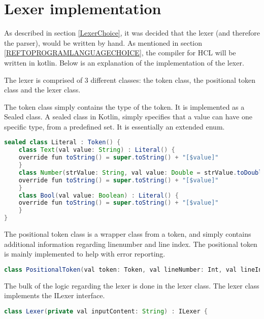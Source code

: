 \section{Lexer implementation}
As described in section \ref{LexerChoice}, it was decided that the lexer (and therefore the parser), would be written by hand.
As mentioned in section \ref{REFTOPROGRAMLANGUAGECHOICE}, the compiler for HCL will be written in kotlin.
Below is an explanation of the implementation of the lexer.

The lexer is comprised of 3 different classes: the token class, the positional token class and the lexer class.

The token class simply contains the type of the token. 
It is implemented as a Sealed class. 
A sealed class in Kotlin, simply specifies that a value can have one specific type, from a predefined set\cite{KotlinSealed}.
It is essentially an extended enum.
\begin{lstlisting}[language=java,label=lis:tokenClass,caption=A snippet from the token class .,firstnumber=9]
sealed class Literal : Token() {
	class Text(val value: String) : Literal() {
	override fun toString() = super.toString() + "[$value]"
	}
	class Number(strValue: String, val value: Double = strValue.toDouble()) : Literal() {
	override fun toString() = super.toString() + "[$value]"
	}
	class Bool(val value: Boolean) : Literal() {
	override fun toString() = super.toString() + "[$value]"
	}
}
\end{lstlisting}

The positional token class is a wrapper class from a token, and simply contains additional information regarding linenumber and line index.
The positional token is mainly implemented to help with error reporting.
\begin{lstlisting}[language=java,label=lis:PositionalTokenClass,caption=A snippet from the token class .,firstnumber=10]
class PositionalToken(val token: Token, val lineNumber: Int, val lineIndex: Int)
\end{lstlisting}

The bulk of the logic regarding the lexer is done in the lexer class.
The lexer class implements the ILexer interface.

\begin{lstlisting}[language=java,label=lis:Lexer,caption=The Lexer .,firstnumber=8]
class Lexer(private val inputContent: String) : ILexer {
\end{lstlisting}

